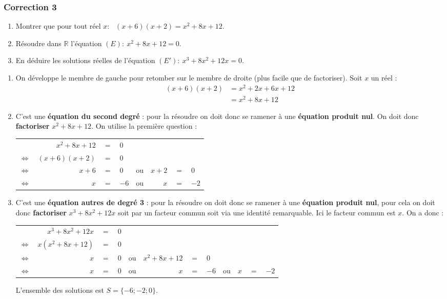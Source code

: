 \documentclass[15pt, mathserif]{beamer}
\newcommand{\R}{\mathbb{R}}			%
\newcommand{\ligneq}[2]{$\Longleftrightarrow$ & $#1$ & $=$ & $#2$ \\}
\newcommand{\Ligneq}[2]{ & $#1$ & $=$ & $#2$ \\}
\newenvironment{RPN}{\begin{center}\begin{tabular}{rrclcrcl}}{\end{tabular}\end{center}}
\newcommand{\lignerpn}[4]{$\Longleftrightarrow$ & $#1$ & $=$ & $#2$ & ou & $#3$ & $=$ & $#4$ \\}
\newenvironment{TRPN}{\begin{center}\begin{tabular}{rrclcrclcrcl}}{\end{tabular}\end{center}}
\newcommand{\lignetrpn}[6]{$\Longleftrightarrow$ & $#1$ & $=$ & $#2$ & ou & $#3$ & $=$ & $#4$ & ou & $#5$ & $=$ & $#6$ \\}
\begin{document}
\begin{frame}
\vspace{-10mm}
	\frametitle{Correction 3}
\begin{enumerate} 
 	 \item Montrer que pour tout réel $x$:~ $(x+6)(x+2)=x^2+8x+12$. 
 	 \item Résoudre dans $\R$ l'équation $(E):~x^2+8x+12= 0$. 
 	 \item En déduire les solutions réelles de l'équation $(E'):~x^3+8x^2+12x = 0$. 
 \end{enumerate} 
 
 \bigskip 
 \bigskip 
 \begin{enumerate} 
 	 \item On développe le membre de gauche pour retomber sur le membre de droite (plus facile que de factoriser). Soit $x$ un réel : 
 	 	 \begin{align*} 
 	 	 (x+6)(x+2)&=x^2+2x+6x+12 \\ 
 	 	 	 &=x^2+8x+12 
 	 \end{align*} 
 \end{enumerate} 
 \end{frame} 
 \begin{frame} 
 \begin{enumerate} \setcounter{enumi}{1}  
 	 \item C'est une \textbf{équation du second degré} : pour la résoudre on doit donc se ramener à une \textbf{équation produit nul}. On doit donc \textbf{factoriser} $x^2+8x+12$. On utilise la première question : 
 	 	  \begin{RPN} 
 	 	  	 \Ligneq{x^2+8x+12}{0} 
 	 	 	 \ligneq{(x+6)(x+2)}{0} 
 	 	 	 \lignerpn{x+6}{0}{x+2}{0} 
 	 	 	 \lignerpn{x}{-6}{x}{-2} 
 	 	  \end{RPN} 
 	 \item C'est une \textbf{équation autres de degré 3} : pour la résoudre on doit donc se ramener à une \textbf{équation produit nul}, pour cela on doit donc \textbf{factoriser} $x^3+8x^2+12x $ soit par un facteur commun soit via une identité remarquable. Ici le facteur commun est $x$. On a donc : 
 	 	 \begin{footnotesize} 
 \begin{TRPN} 
 	 	 	 \Ligneq{x^3+8x^2+12x}{0} 
 	 	 	 \ligneq{x(x^2+8x+12)}{0} 
 	 	 	 \lignerpn{x}{0}{x^2+8x+12}{0} 
 	 	 	 \lignetrpn{x}{0}{x}{-6}{x}{-2} 
 	 	 \end{TRPN} 
 \end{footnotesize} L'ensemble des solutions est $S=\{-6;-2;0\}$. 
 \end{enumerate} 
 
 \end{frame}
\end{document}
